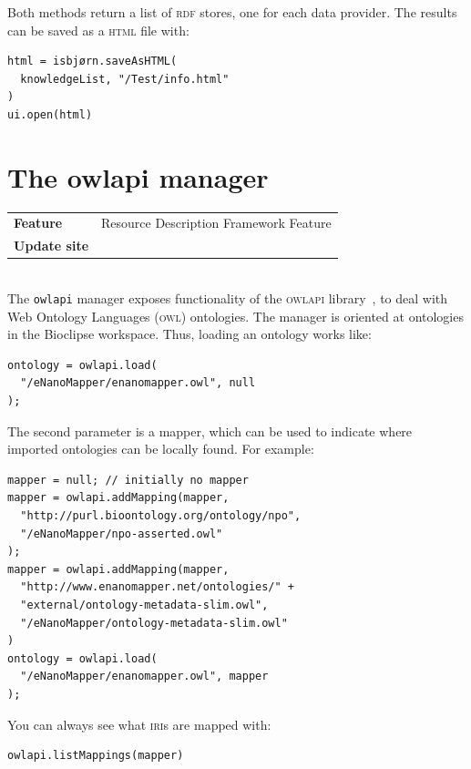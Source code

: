\documentclass{book}
\begin{document}
\begin{refsection}
Both methods return a list of \textsc{rdf} stores, one for each data provider.
The results can be saved as a \textsc{html} file with:

\begin{Verbatim}
html = isbjørn.saveAsHTML(
  knowledgeList, "/Test/info.html"
)
ui.open(html)
\end{Verbatim}

\section{The owlapi manager}

\begin{tabular}{ll}
\textbf{Feature} & Resource Description Framework Feature \\
\textbf{Update site} & \url{} \\
\end{tabular} \\

The \texttt{owlapi} manager exposes functionality of the \textsc{owlapi}
library~\cite{Horridge2011}, to deal with Web Ontology Languages
(\textsc{owl}) ontologies. The manager is oriented at ontologies
in the Bioclipse workspace. Thus, loading an ontology works
like:

\begin{Verbatim}
ontology = owlapi.load(
  "/eNanoMapper/enanomapper.owl", null
);
\end{Verbatim}

The second parameter is a mapper, which can be used to indicate
where imported ontologies can be locally found.
For example:

\begin{Verbatim}
mapper = null; // initially no mapper
mapper = owlapi.addMapping(mapper,
  "http://purl.bioontology.org/ontology/npo",
  "/eNanoMapper/npo-asserted.owl"
);
mapper = owlapi.addMapping(mapper,
  "http://www.enanomapper.net/ontologies/" + 
  "external/ontology-metadata-slim.owl",
  "/eNanoMapper/ontology-metadata-slim.owl"
)
ontology = owlapi.load(
  "/eNanoMapper/enanomapper.owl", mapper
);
\end{Verbatim}

You can always see what \textsc{iri}s are mapped with:

\begin{Verbatim}
owlapi.listMappings(mapper)
\end{Verbatim}


\end{refsection}
\end{document}
